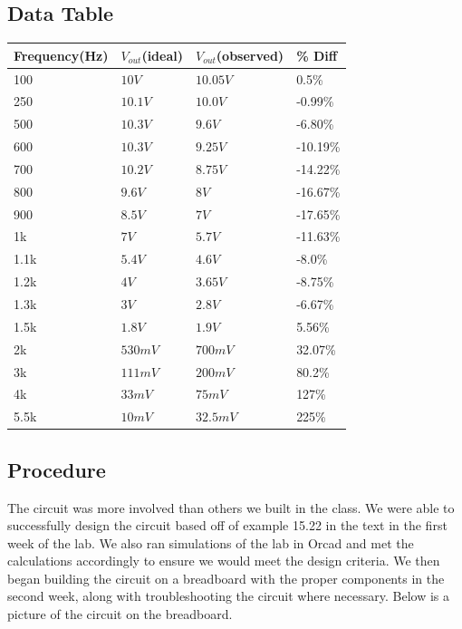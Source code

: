 \documentclass[11pt]{article}
\begin{document}
	\subsection*{Data Table}
		\begin{table}[H]
		\def\arraystretch{1.2}%
		\centering
		\begin{tabular}{|l|l|l|l|}
			\hline
			Frequency(Hz)		& $V_{out}$(ideal)		&  $V_{out}$(observed) 			&\% Diff	\\ \hline
			100  				& $10V$						& $10.05V$        			&0.5\%		\\ \hline	
			250					& $10.1V $					& $10.0V $    				&-0.99\%	\\ \hline
			500					& $10.3V$					& $9.6V$					&-6.80\%	\\ \hline
			600					& $10.3V$					& $9.25V$					&-10.19\%	\\ \hline
			700					& $10.2V$					& $8.75V$					&-14.22\%	\\ \hline
			800					& $9.6V$					& $8V$						&-16.67\%	\\ \hline
			900					& $8.5V$					& $7V$						&-17.65\%	\\ \hline
			1k					& $7V$						& $5.7V$					&-11.63\%	\\ \hline
			1.1k				& $5.4V$					& $4.6V$					&-8.0\%		\\ \hline
			1.2k				& $4V$						& $3.65V$					&-8.75\%	\\ \hline
			1.3k				& $3V$						& $2.8V$					&-6.67\%	\\ \hline
			1.5k				& $1.8V$					& $1.9V$					&5.56\%		\\ \hline
			2k					& $530mV$					& $700mV$					&32.07\%	\\ \hline
			3k					& $111mV$					& $200mV$					&80.2\%		\\ \hline
			4k					& $33mV$					& $75mV$					&127\%		\\ \hline
			5.5k				& $10mV$					& $32.5mV$					&225\%		\\ \hline				
	\end{tabular}
	\end{table}
	\subsection*{Procedure}
	The circuit was more involved than others we built in the class. We were able to successfully design the circuit based off of example 15.22 in the text in the first week of the lab. We also ran simulations of the lab in Orcad and met the calculations accordingly to ensure we would meet the design criteria. We then began building the circuit on a breadboard with the proper components in the second week, along with troubleshooting the circuit where necessary. Below is a picture of the circuit on the breadboard.
			
\end{document}
